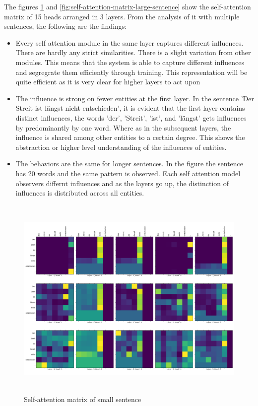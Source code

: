 \documentclass[a4paper, 11pt]{article}
\begin{document}
The figures \ref{fig:self-attention-matrix-small-sentence} and \ref{fig:self-attention-matrix-large-sentence} show the self-attention matrix of 15 heads arranged in 3 layers. From the analysis of it with multiple sentences, the following are the findings:

\begin{itemize}
\item Every self attention module in the same layer captures different influences. There are hardly any strict similarities. There is a slight variation from other modules. This means that the system is able to capture different influences and segregrate them efficiently through training. This representation will be quite efficient as it is very clear for higher layers to act upon 
\item  The influence is strong on fewer entities at the first layer. In the sentence 'Der Streit ist längst nicht entschieden', it is evident that the first layer contains distinct influences, the words 'der', 'Streit', 'ist', and 'längst' gets influences by predominantly by one word. Where as in the subsequent layers, the influence is shared among other entities to a certain degree. This shows the abstraction or higher level understanding of the influences of entities.

\item The behaviors are the same for longer sentences. In the figure the sentence has 20 words and the same pattern is observed. Each self attention model observers differnt influences and as the layers go up, the distinction of influences is distributed across all entities.
\end{itemize}

\begin{figure}[H]
    \centering
    \includegraphics[width=\textwidth,height=10cm,keepaspectratio=true]
    {self-attention-matrix-1.png}
    \caption{
        Self-attention matrix of small sentence
    }
    \label{fig:self-attention-matrix-small-sentence}
\end{figure}
\end{document}
